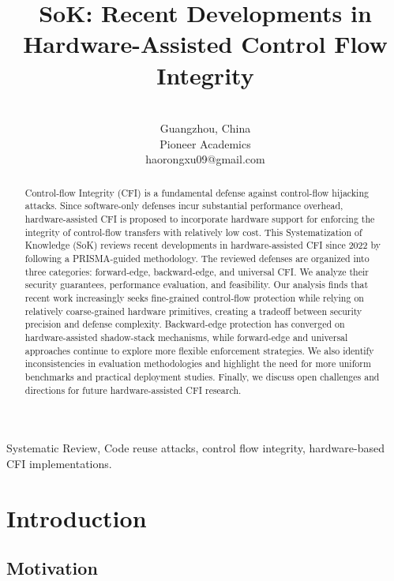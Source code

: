 \documentclass[journal,onecolumn]{IEEEtran}
\begin{document}
\title{SoK: Recent Developments in Hardware-Assisted Control Flow Integrity}
\author{\\
		Guangzhou, China \\
        Pioneer Academics \\
		haorongxu09@gmail.com}
\maketitle

\begin{abstract}

Control-flow Integrity (CFI) is a fundamental defense against control-flow hijacking attacks. Since software-only defenses incur substantial performance overhead, hardware-assisted CFI is proposed to incorporate hardware support for enforcing the integrity of control-flow transfers with relatively low cost. This Systematization of Knowledge (SoK) reviews recent developments in hardware-assisted CFI since 2022 by following a PRISMA-guided methodology. The reviewed defenses are organized into three categories: forward-edge, backward-edge, and universal CFI. We analyze their security guarantees, performance evaluation, and feasibility. Our analysis finds that recent work increasingly seeks fine-grained control-flow protection while relying on relatively coarse-grained hardware primitives, creating a tradeoff between security precision and defense complexity. Backward-edge protection has converged on hardware-assisted shadow-stack mechanisms, while forward-edge and universal approaches continue to explore more flexible enforcement strategies. We also identify inconsistencies in evaluation methodologies and highlight the need for more uniform benchmarks and practical deployment studies. Finally, we discuss open challenges and directions for future hardware-assisted CFI research.

\end{abstract}
\begin{IEEEkeywords}
	Systematic Review, Code reuse attacks, control flow integrity, hardware-based CFI implementations.
\end{IEEEkeywords}

\section{Introduction}

\subsection{Motivation}
\end{document}
